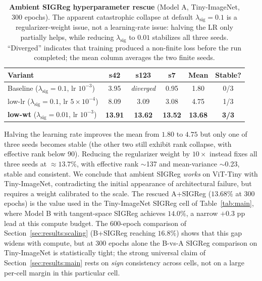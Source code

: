\documentclass{article}
\begin{document}
\begin{table}[t]
  \centering
  \caption{\textbf{Ambient SIGReg hyperparameter rescue} (Model A, Tiny-ImageNet, 300 epochs). The apparent catastrophic collapse at default $\lambda_{\text{sig}}{=}0.1$ is a regularizer-weight issue, not a learning-rate issue: halving the LR only partially helps, while reducing $\lambda_{\text{sig}}$ to $0.01$ stabilizes all three seeds. ``Diverged'' indicates that training produced a non-finite loss before the run completed; the mean column averages the two finite seeds.}
  \label{tab:sigfix}
  \small
  \begin{tabular}{l c c c c c}
    \toprule
    Variant & s42 & s123 & s7 & Mean & Stable? \\
    \midrule
    Baseline ($\lambda_{\text{sig}}{=}0.1$, lr $10^{-3}$) & 3.95 & \emph{diverged} & 0.95 & 1.80 & 0/3 \\
    low-lr  ($\lambda_{\text{sig}}{=}0.1$, lr $5{\times}10^{-4}$) & 8.09 & 3.09 & 3.08 & 4.75 & 1/3 \\
    \textbf{low-wt} ($\lambda_{\text{sig}}{=}0.01$, lr $10^{-3}$) & \textbf{13.91} & \textbf{13.62} & \textbf{13.52} & \textbf{13.68} & \textbf{3/3} \\
    \bottomrule
  \end{tabular}
\end{table}

Halving the learning rate improves the mean from $1.80$ to $4.75$ but only one of three seeds becomes stable (the other two still exhibit rank collapse, with effective rank below 90). Reducing the regularizer weight by $10{\times}$ instead fixes all three seeds at $\approx 13.7\%$, with effective rank $\sim$137 and mean-variance $\sim$0.23, stable and consistent. We conclude that ambient SIGReg \emph{works} on ViT-Tiny with Tiny-ImageNet, contradicting the initial appearance of architectural failure, but requires a weight calibrated to the scale. The rescued A+SIGReg ($13.68\%$ at 300 epochs) is the value used in the Tiny-ImageNet SIGReg cell of Table~\ref{tab:main}, where Model B with tangent-space SIGReg achieves $14.0\%$, a narrow $+0.3$ pp lead at this compute budget. The 600-epoch comparison of Section~\ref{sec:results:scaling} (B+SIGReg reaching $16.8\%$) shows that this gap widens with compute, but at 300 epochs alone the B-vs-A SIGReg comparison on Tiny-ImageNet is statistically tight; the strong universal claim of Section~\ref{sec:results:main} rests on \emph{sign} consistency across cells, not on a large per-cell margin in this particular cell.
\end{document}
